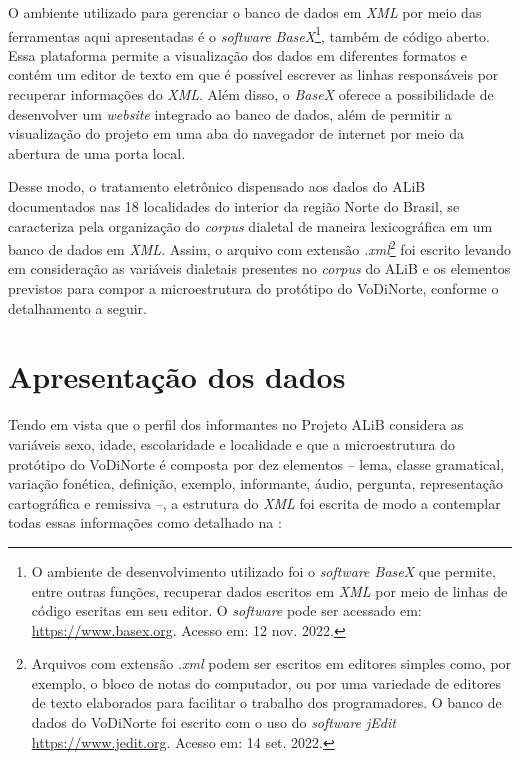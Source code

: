 \documentclass[portuguese]{textolivre}
\begin{document}
O ambiente utilizado para gerenciar o banco de dados em \emph{XML} por meio das ferramentas aqui apresentadas é o \emph{software BaseX}\footnote{O ambiente de desenvolvimento utilizado foi o \emph{software BaseX} que permite, entre outras funções, recuperar dados escritos em \emph{XML} por meio de linhas de código escritas em seu editor. O \emph{software} pode ser acessado em: \url{https://www.basex.org}. Acesso em: 12 nov. 2022.}, também de código aberto. Essa plataforma permite a visualização dos dados em diferentes formatos e contém um editor de texto em que é  possível escrever as linhas responsáveis por recuperar informações do \emph{XML}. Além disso, o \emph{BaseX} oferece a possibilidade de desenvolver um \emph{website} integrado ao banco de dados, além de permitir a visualização do projeto em uma aba do navegador de internet por meio da abertura de uma porta local. 

Desse modo, o tratamento eletrônico dispensado aos dados do ALiB documentados nas 18 localidades do interior da região Norte do Brasil, se caracteriza pela organização do \emph{corpus} dialetal de maneira lexicográfica em um banco de dados em \emph{XML}. Assim, o arquivo com extensão \emph{.xml}\footnote{Arquivos com extensão \emph{.xml} podem ser escritos em editores simples como, por exemplo, o bloco de notas do computador, ou por uma variedade de editores de texto elaborados para facilitar o trabalho dos programadores. O banco de dados do VoDiNorte foi escrito com o uso do \emph{software jEdit} \url{https://www.jedit.org}. Acesso em: 14 set. 2022.} foi escrito levando em consideração as variáveis dialetais presentes no \textit{corpus} do ALiB e os elementos previstos para compor a microestrutura do protótipo do VoDiNorte, conforme o detalhamento a seguir.



\section{Apresentação dos dados}

Tendo em vista que o perfil dos informantes no Projeto ALiB considera as variáveis sexo, idade, escolaridade e localidade e que a microestrutura do protótipo do VoDiNorte é composta por dez elementos – lema, classe gramatical, variação fonética, definição, exemplo, informante, áudio, pergunta, representação cartográfica e remissiva –, a estrutura do \emph{XML} foi escrita de modo a contemplar todas essas informações como detalhado na :
\end{document}

